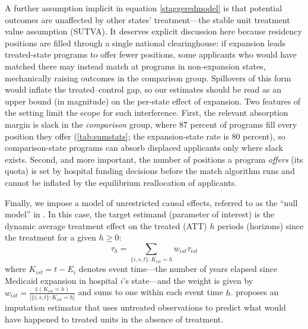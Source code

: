 A further assumption implicit in equation \eqref{staggeredmodel} is that potential outcomes are unaffected by other states' treatment---the stable unit treatment value assumption (SUTVA). It deserves explicit discussion here because residency positions are filled through a single national clearinghouse: if expansion leads treated-state programs to offer fewer positions, some applicants who would have matched there may instead match at programs in non-expansion states, mechanically raising outcomes in the comparison group. Spillovers of this form would inflate the treated--control gap, so our estimates should be read as an upper bound (in magnitude) on the per-state effect of expansion. Two features of the setting limit the scope for such interference. First, the relevant absorption margin is slack in the \emph{comparison} group, where $87$ percent of programs fill every position they offer (\cref{tab:sumstats}; the expansion-state rate is $80$ percent), so comparison-state programs can absorb displaced applicants only where slack exists. Second, and more important, the number of positions a program \emph{offers} (its quota) is set by hospital funding decisions before the match algorithm runs and cannot be inflated by the equilibrium reallocation of applicants. 
 
Finally, we impose a model of unrestricted causal effects, referred to as the ``null model'' in \textcite{borusyak2024revisiting}. In this case, the target estimand (parameter of interest) is the dynamic average treatment effect on the treated (ATT) $h$ periods (horizons) since the treatment for a given $h\ge 0$:
\begin{equation}\label{estimand}
		\tau_h = \sum_{\{i,s,t\}: K_{ist}=h} w_{ist} \tau_{ist}
\end{equation}
where $K_{ist} = t - E_i$ denotes event time---the number of years elapsed since
Medicaid expansion in hospital $i$'s state---and the weight is given by $w_{ist} = \frac{\mathbb{1}(K_{ist}=h)}{|\{i,s,t\}: K_{ist}=h|}$ and sums to one within each event time $h$. \textcite{borusyak2024revisiting} proposes an imputation estimator that uses untreated observations to predict what would have happened to treated units in the absence of treatment. 
 
